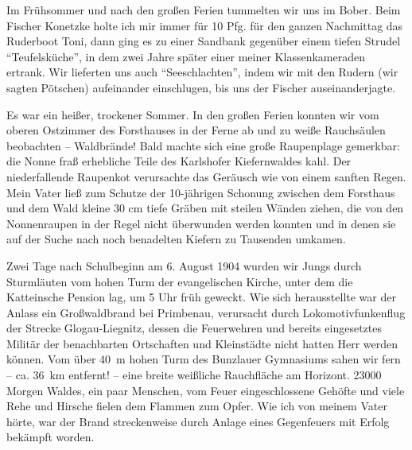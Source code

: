 \documentclass[a5paper,pagesize,10pt,twoside=true]{scrbook}
\begin{document}
Im Frühsommer und nach den großen Ferien tummelten wir uns im Bober. Beim Fischer Konetzke holte ich mir immer für 10 Pfg. für den ganzen Nachmittag das Ruderboot Toni, dann ging es zu einer Sandbank gegenüber einem tiefen Strudel \enquote{Teufelsküche}, in dem zwei Jahre später einer meiner Klassenkameraden ertrank. Wir lieferten uns auch \enquote{Seeschlachten}, indem wir mit den Rudern (wir sagten Pötschen) aufeinander einschlugen, bis uns der Fischer auseinanderjagte.

Es war ein heißer, trockener Sommer. In den großen Ferien konnten wir vom oberen Ostzimmer des Forsthauses in der Ferne ab und zu weiße Rauchsäulen beobachten -- Waldbrände! Bald machte sich eine große Raupenplage gemerkbar: die Nonne fraß erhebliche Teile des Karlshofer Kiefernwaldes kahl. Der niederfallende Raupenkot verursachte das Geräusch wie von einem sanften Regen. Mein Vater ließ zum Schutze der 10-jährigen Schonung zwischen dem Forsthaus und dem Wald kleine 30 cm tiefe Gräben mit steilen Wänden ziehen, die von den Nonnenraupen in der Regel nicht überwunden werden konnten und in denen sie auf der Suche nach noch benadelten Kiefern zu Tausenden umkamen.

Zwei Tage nach Schulbeginn am 6. August 1904 wurden wir Jungs durch Sturmläuten vom hohen Turm der evangelischen Kirche, unter dem die Katteinsche Pension lag, um 5 Uhr früh geweckt. Wie sich herausstellte war der Anlass ein Großwaldbrand bei Primbenau, verursacht durch Lokomotivfunkenflug der Strecke Glogau-Liegnitz, dessen die Feuerwehren und bereits eingesetztes Militär der benachbarten Ortschaften und Kleinstädte nicht hatten Herr werden können. Vom über 40~m hohen Turm des Bunzlauer Gymnasiums sahen wir fern -- ca. 36~km entfernt! -- eine breite weißliche Rauchfläche am Horizont. \num{23000} Morgen Waldes, ein paar Menschen, vom Feuer eingeschlossene Gehöfte und viele Rehe und Hirsche fielen dem Flammen zum Opfer. Wie ich von meinem Vater hörte, war der Brand streckenweise durch Anlage eines Gegenfeuers mit Erfolg bekämpft worden.
\end{document}
